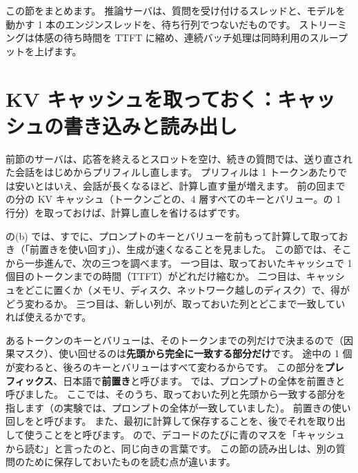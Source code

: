 この節をまとめます。
推論サーバは、質問を受け付けるスレッドと、モデルを動かす 1 本のエンジンスレッドを、待ち行列でつないだものです。
ストリーミングは体感の待ち時間を TTFT に縮め、連続バッチ処理は同時利用のスループットを上げます。

\section{KV キャッシュを取っておく：キャッシュの書き込みと読み出し}\label{sec:es-cache}

前節のサーバは、応答を終えるとスロットを空け、続きの質問では、送り直された会話をはじめからプリフィルし直します。
プリフィルは 1 トークンあたりでは安いとはいえ、会話が長くなるほど、計算し直す量が増えます。
前の回までの分の KV キャッシュ（トークンごとの、4 層すべてのキーとバリュー。の 1 行分）を取っておけば、計算し直しを省けるはずです。

の(b) では、すでに、プロンプトのキーとバリューを前もって計算して取っておき（「前置きを使い回す」）、生成が速くなることを見ました。
この節では、そこから一歩進んで、次の三つを調べます。
一つ目は、取っておいたキャッシュで 1 個目のトークンまでの時間（TTFT）がどれだけ縮むか。
二つ目は、キャッシュをどこに置くか（メモリ、ディスク、ネットワーク越しのディスク）で、得がどう変わるか。
三つ目は、新しい列が、取っておいた列とどこまで一致していれば使えるかです。

あるトークンのキーとバリューは、そのトークンまでの列だけで決まるので（因果マスク）、使い回せるのは\textbf{先頭から完全に一致する部分だけ}です。
途中の 1 個が変わると、後ろのキーとバリューはすべて変わるからです。
この部分を\textbf{プレフィックス}、日本語で\textbf{前置き}と呼びます。
では、プロンプトの全体を前置きと呼びました。
ここでは、そのうち、取っておいた列と先頭から一致する部分を指します（の実験では、プロンプトの全体が一致していました）。
前置きの使い回しをと呼びます。
また、最初に計算して保存することを、後でそれを取り出して使うことをと呼びます。
ので、デコードのたびに青のマスを「キャッシュから読む」と言ったのと、同じ向きの言葉です。
この節の読み出しは、別の質問のために保存しておいたものを読む点が違います。

